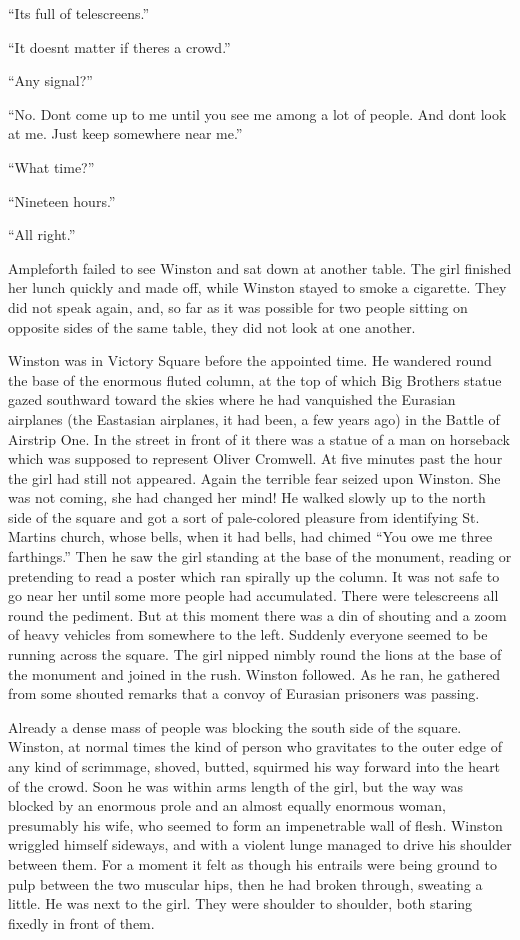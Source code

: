 ``It\textquotesingle s full of telescreens.''

``It doesn\textquotesingle t matter if there\textquotesingle s a crowd.''

``Any signal?''

``No. Don\textquotesingle t come up to me until you see me among a lot of
people. And don\textquotesingle t look at me. Just keep somewhere near
me.''

``What time?''

``Nineteen hours.''

``All right.''

Ampleforth failed to see Winston and sat down at another table. The girl
finished her lunch quickly and made off, while Winston stayed to smoke a
cigarette. They did not speak again, and, so far as it was possible for
two people sitting on opposite sides of the same table, they did not
look at one another.

Winston was in Victory Square before the appointed time. He wandered
round the base of the enormous fluted column, at the top of which Big
Brother\textquotesingle s statue gazed southward toward the skies where
he had vanquished the Eurasian airplanes (the Eastasian airplanes, it
had been, a few years ago) in the Battle of Airstrip One. In the street
in front of it there was a statue of a man on horseback which was
supposed to represent Oliver Cromwell. At five minutes past the hour the
girl had still not appeared. Again the terrible fear seized upon
Winston. She was not coming, she had changed her mind! He walked slowly
up to the north side of the square and got a sort of pale-colored
pleasure from identifying St. Martin\textquotesingle s church, whose
bells, when it had bells, had chimed ``You owe me three farthings.'' Then
he saw the girl standing at the base of the monument, reading or
pretending to read a poster which ran spirally up the column. It was not
safe to go near her until some more people had accumulated. There were
telescreens all round the pediment. But at this moment there was a din
of shouting and a zoom of heavy vehicles from somewhere to the left.
Suddenly everyone seemed to be running across the square. The girl
nipped nimbly round the lions at the base of the monument and joined in
the rush. Winston followed. As he ran, he gathered from some shouted
remarks that a convoy of Eurasian prisoners was passing.

Already a dense mass of people was blocking the south side of the
square. Winston, at normal times the kind of person who gravitates to
the outer edge of any kind of scrimmage, shoved, butted, squirmed his
way forward into the heart of the crowd. Soon he was within
arm\textquotesingle s length of the girl, but the way was blocked by an
enormous prole and an almost equally enormous woman, presumably his
wife, who seemed to form an impenetrable wall of flesh. Winston wriggled
himself sideways, and with a violent lunge managed to drive his shoulder
between them. For a moment it felt as though his entrails were being
ground to pulp between the two muscular hips, then he had broken
through, sweating a little. He was next to the girl. They were shoulder
to shoulder, both staring fixedly in front of them.

